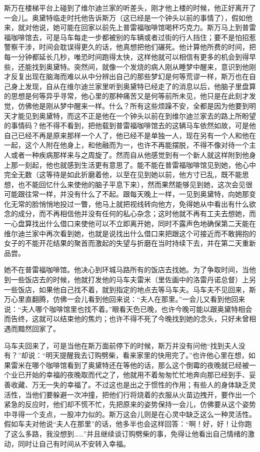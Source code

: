 \par 斯万在楼梯平台上碰到了维尔迪兰家的听差头，刚才他上楼的时候，他正好离开了一会儿。奥黛特临走时托他告诉斯万（这已经是一个钟头以前的事情了），假如他来，就对他说，她可能在回家以前先上普雷福咖啡馆喝杯巧克力。斯万马上到普雷福咖啡馆去，可是马车每走一步都被别的车辆或者过街的行人挡住；要不是怕招惹警察干涉，时间会耽误得更久的话，他真想把他们碾死。他计算他所费的时间，把每一分钟都延长几秒，唯恐时间跑得太快，这样他就可以相信有更多的机会到得早些，还能找到奥黛特。突然间，就像一个发烧的病人刚从睡梦中醒来，意识到他刚才反复出现在脑海而难以从中分辨出自己的那些梦幻是何等荒谬一样，斯万也在自己身上发现，自从在维尔迪兰家里听到奥黛特已经走了的消息以后，他脑子里盘算的思想是何等异乎寻常，他心里的那种痛苦又是何等前所未见，他只是在此刻才发觉，仿佛他是刚从梦中醒来一样。什么？所有这些烦躁不安，全都是因为他要到明天才能见到奥黛特，而这不正是他在一个钟头以前在到维尔迪兰家去的路上所盼望的事情码？他不得不看到，把他载到普雷福咖啡馆去的这辆马车依然如故，可是他自己已经不再是原来那样一个人了，他已经不是单独一人，现在另有一个人和他在一起，这个人附在他身上，和他融而为一，也许不再能摆脱，不得不像对待一个主人或者一种疾病那样来与之周旋了。然而自从他感觉到有一个新人就这样附到他身上那一刻起，他也就感到生活更有意思了。能不能在普雷福咖啡馆见到她，他心中完全无数（这等待是如此折磨着他，以至在见到她以前，他方寸已乱，既不能思想，也不能回忆什么来使他的脑子平息下来），然而果然能够见到她，这次会见很可能跟往常一样，并没有什么了不起。跟每天晚上一样，一见到奥黛特，向她那变化无常的脸悄悄地投过一瞥，他马上就把视线转向他方，免得她从中看出有什么欲念的成分，而不再相信他并没有任何的私心杂念；这时他就不再有工夫去想她，而一心盘算找出什么借口来使他可以不立即离开她，同时不露声色地确保第二天能在维尔迪兰家中再次看到她，也就是说找出什么借口来把跟这个可接近而不敢拥抱的女子的不能开花结果的聚首而激起的失望与折磨在当时持续下去，并在第二天重新品尝。
\par 她不在普雷福咖啡馆。他决心到环城马路所有的饭店去找她。为了争取时间，当他到一些饭店去的时候，他就打发他的马车夫雷米（里佐画中的洛雷丹诺总督）上另一些饭店，如果他自己找不着，就到指定的地点去等马车夫。马车夫不见回来，斯万心里直翻腾，仿佛一会儿看到他回来说：“夫人在那里。”一会儿又看到他回来说：“夫人哪个咖啡馆里也找不着。”眼看天色已晚，也许今晚可能以跟奥黛特相会而告终，这就可以结束他的焦灼；也许不得不死了今晚找到她的念头，只好未曾相遇而黯然回家了。
\par 马车夫回来了，可是当他在斯万面前停下的时候，斯万并没有问他“找到夫人没有？”却说：“明天提醒我去订购劈柴，看来家里的快用完了。”也许他心里在想，如果雷米在哪个咖啡馆看到了奥黛特还在等他的话，那么这个倒霉的夜晚就已经被一个业已开始的幸福的夜晚取而代之了，他就用不着匆匆忙忙地奔向那已经到手、妥善收藏、万无一失的幸福了。不过这也是出之于惯性的作用；有些人的身体缺乏灵活性，当他们要躲避一次冲撞，把他们行将烧着的衣服从火苗边拽开，要作出一个紧急的反应时，他们却不慌不忙，先把原来的姿势保持一会儿，仿佛要从这个姿势中寻得一个支点，一股冲力似的。斯万这会儿则是在心灵中缺乏这么一种灵活性。假如车夫对他说“夫人在那里”的话，他多半也会这样回答：“啊！好，好！让你跑了这么多路，我没想到……”并且继续谈订购劈柴的事，免得让他看出自己情绪的激动，同时让自己有时间从不安转入幸福。
